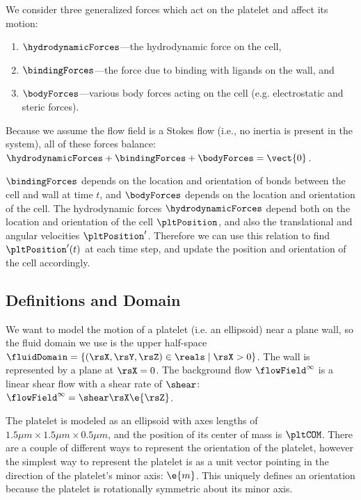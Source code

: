 We consider three generalized forces which act on the platelet and
affect its motion:
\begin{enumerate}
\item $\hydrodynamicForces$---the hydrodynamic force on the cell, 
\item $\bindingForces$---the force due to binding with ligands on the wall, and
\item $\bodyForces$---various body forces acting on the cell
  (e.g. electrostatic and steric forces).
\end{enumerate}
Because we assume the flow field is a Stokes flow (i.e., no inertia is
present in the system), all of these forces balance:
$\hydrodynamicForces + \bindingForces + \bodyForces = \vect{0}$.

$\bindingForces$ depends on the location and orientation of bonds
between the cell and wall at time $t$, and $\bodyForces$ depends on
the location and orientation of the cell. The hydrodynamic forces
$\hydrodynamicForces$ depend both on the location and orientation of
the cell $\pltPosition$, and also the translational and angular
velocities $\pltPosition'$. Therefore we can use this relation to find
$\pltPosition'(t)$ at each time step, and update the position and
orientation of the cell accordingly.

\subsection{Definitions and Domain}
\label{sec:definitions-domain}

We want to model the motion of a platelet (i.e. an ellipsoid) near a
plane wall, so the fluid domain we use is the upper half-space
$\fluidDomain = \{(\rsX, \rsY, \rsZ) \in \reals \mid \rsX > 0\}$. The wall
is represented by a plane at $\rsX = 0$. The background flow
$\flowField^\infty$ is a linear shear flow with a shear rate of
$\shear$: $\flowField^\infty = \shear \rsX \e{\rsZ}$.

The platelet is modeled as an ellipsoid with axes lengths of
$1.5 \mu m \times 1.5 \mu m \times 0.5 \mu m$, and the position of its
center of mass is $\pltCOM$. There are a couple of different ways to
represent the orientation of the platelet, however the simplest way to
represent the platelet is as a unit vector pointing in the direction
of the platelet's minor axis: $\e{m}$. This uniquely defines an
orientation because the platelet is rotationally symmetric about its
minor axis.

